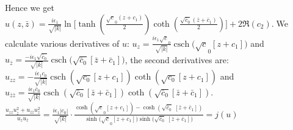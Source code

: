 \documentclass[12pt]{article}
\theoremstyle{plain}
\theoremstyle{definition}
\theoremstyle{remark}
\begin{document}
  Hence we get \footnotesize\(\boxed{u(z,\bar z)=\tfrac{i\epsilon_1}{\sqrt{|k|}}\ln\big[\tanh(\tfrac{\sqrt c_0(z+c_1)}{2})\coth(\tfrac{\sqrt{\bar c_0}(\bar z+\bar c_1)}{2})\big]+2\Re(c_2)}.\;\)\normalsize We calculate various derivatives of \(u\): \(u_z=\tfrac{i\epsilon_1\sqrt c_0}{\sqrt{|k|}}\operatorname{csch}\!\big(\sqrt c_0[z+c_1]\big)\) and \(u_{\bar z}=\tfrac{-i\epsilon_1\sqrt{\bar c_0}}{\sqrt{|k|}}\operatorname{csch}\!\big(\sqrt{\bar c_0}[\bar z+\bar c_1]\big)\), the second derivatives are: \(u_{zz}=-\tfrac{i\epsilon_1 c_0}{\sqrt{|k|}} \operatorname{csch}(\sqrt{c_0}[z + c_1]) \operatorname{coth}(\sqrt{c_0}[z + c_1])\) and \footnotesize\(u_{\bar z \bar z} = \tfrac{i\epsilon_1 \bar{c}_0}{\sqrt{|k|}} \operatorname{csch}(\sqrt{\bar{c}_0}[\bar{z} + \bar{c}_1]) \operatorname{coth}(\sqrt{\bar{c}_0}[\bar{z} + \bar{c}_1])\). \( \tfrac{u_{zz}u_{\overline{z}}^2+u_{\overline{z}\overline{z}}u_z^2}{u_zu_{\overline{z}}}=\tfrac{i\epsilon_1|c_0|}{\sqrt{|k|}}\cdot\tfrac{\cosh(\sqrt c_0[z+c_1])-\cosh(\sqrt{\bar c_0}\;[\bar z+\bar c_1])}{\sinh\big(\sqrt c_0[z+c_1]\big)\sinh\big(\sqrt{\bar c_0}\;[\bar z+\bar c_1]\big)}=j(u)
  \)\normalsize 
  
\end{document}
